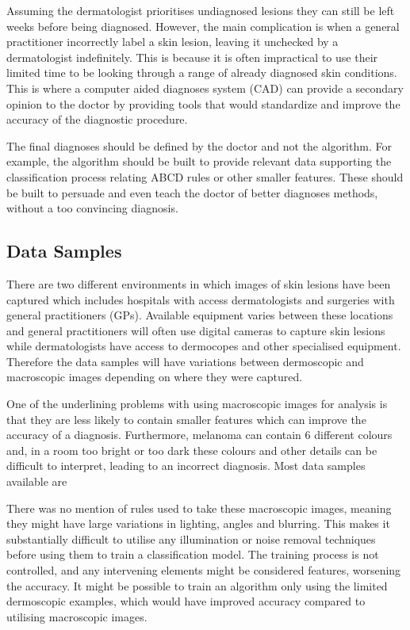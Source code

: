 Assuming the dermatologist prioritises undiagnosed lesions they can still be left weeks before being diagnosed. However, the main complication is when a general practitioner incorrectly label a skin lesion, leaving it unchecked by a dermatologist indefinitely. This is because it is often impractical to use their limited time to be looking through a range of already diagnosed skin conditions. This is where a computer aided diagnoses system (CAD) can provide a secondary opinion to the doctor by providing tools that would standardize and improve the accuracy of the diagnostic procedure.

The final diagnoses should be defined by the doctor and not the algorithm. For example, the algorithm should be built to provide relevant data supporting the classification process relating ABCD rules or other smaller features. These should be built to persuade and even teach the doctor of better diagnoses methods, without a too convincing diagnosis.

\subsection{Data Samples}
There are two different environments in which images of skin lesions have been captured which includes hospitals with access dermatologists and surgeries with general practitioners (GPs). Available equipment varies between these locations and general practitioners will often use digital cameras to capture skin lesions while dermatologists have access to dermocopes and other specialised equipment. Therefore the data samples will have variations between dermoscopic and macroscopic images depending on where they were captured.

One of the underlining problems with using macroscopic images for analysis is that they are less likely to contain smaller features which can improve the accuracy of a diagnosis\cite{}. Furthermore, melanoma can contain 6 different colours and, in a room too bright or too dark these colours and other details can be difficult to interpret, leading to an incorrect diagnosis. Most data samples available are

There was no mention of rules used to take these macroscopic images, meaning they might have large variations in lighting, angles and blurring. This makes it substantially difficult to utilise any illumination or noise removal techniques before using them to train a classification model. The training process is not controlled, and any intervening elements might be considered features, worsening the accuracy. It might be possible to train an algorithm only using the limited dermoscopic examples, which would have improved accuracy \cite{Holmes2018} compared to utilising macroscopic images.

